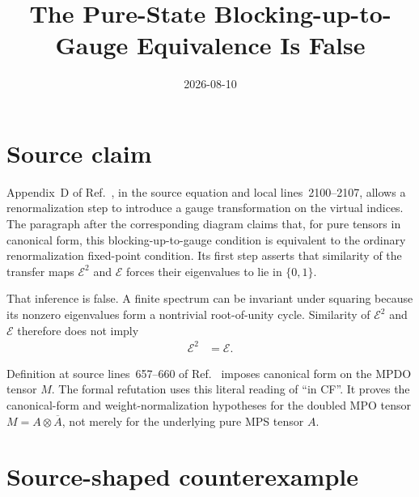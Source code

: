 \documentclass{article}
\title{The Pure-State Blocking-up-to-Gauge Equivalence Is False}
\author{}
\date{2026-08-10}
\begin{document}
\maketitle
{}

\section{Source claim}

Appendix~D of Ref.~\cite{Cirac2016MPDO_arXiv}, in the source equation
 and local lines~2100--2107, allows a renormalization step to
introduce a gauge transformation on the virtual indices. The paragraph after
the corresponding diagram claims that, for pure tensors in canonical form,
this blocking-up-to-gauge condition is equivalent to the ordinary
renormalization fixed-point condition. Its first step asserts that similarity
of the transfer maps $\mathcal E^2$ and $\mathcal E$ forces their eigenvalues
to lie in $\{0,1\}$.

That inference is false. A finite spectrum can be invariant under squaring
because its nonzero eigenvalues form a nontrivial root-of-unity cycle.
Similarity of $\mathcal E^2$ and $\mathcal E$ therefore does not imply
\begin{align}
    \mathcal E^2 &= \mathcal E.
    \label{eq:cpsv16_rfp_gauge_pure_equivalence_false_unjustified_idempotence}
\end{align}

Definition  at source lines~657--660 of
Ref.~\cite{Cirac2016MPDO_arXiv} imposes canonical form on the MPDO tensor $M$.
The formal refutation uses this literal reading of ``in CF''. It proves the
canonical-form and weight-normalization hypotheses for the doubled MPO tensor
$M=A\otimes\overline A$, not merely for the underlying pure MPS tensor $A$.

\section{Source-shaped counterexample}
\end{document}
